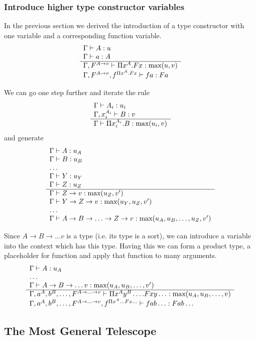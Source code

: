 \subsubsection{Introduce higher type constructor variables}

In the previous section we derived the introduction of a type constructor with
one variable and a corresponding function variable.
$$
\rulev
{
    \Gamma \vdash A: u
    \\
    \Gamma \vdash a: A

}
{
    \Gamma, F^{A\to v} \vdash \Pi x^A. F x: \max(u,v)
    \\
    \Gamma, F^{A\to v}, f^{\Pi x^A. F x} \vdash f a: F a
}
$$

We can go one step further and iterate the rule
$$
\begin{array}{l} 
    \Gamma \vdash A_i: u_i
    \\
    \Gamma, x_i^{A_i} \vdash B: v
 \\ \hline 
    \Gamma \vdash \Pi x_i^{A_i}. B : \text{max}(u_i, v)
\end{array}
$$
%
and generate
%
$$
\begin{array}{l} 
    \Gamma \vdash A: u_A
    \\
    \Gamma \vdash B: u_B
    \\
    \ldots
    \\
    \Gamma \vdash Y: u_Y
    \\
    \Gamma \vdash Z: u_Z
 \\ \hline 
    \Gamma \vdash Z \to v : \text{max}(u_Z, v')
    \\
    \Gamma \vdash Y \to Z \to v: \text{max}(u_Y, u_Z, v')
    \\
    \ldots
    \\
    \Gamma
    \vdash
    A \to B \to \ldots \to Z \to v:
    \text{max}(u_A, u_B, \ldots, u_Z, v')
\end{array}
$$

Since $A \to B \to \ldots v$ is a type (i.e. its type is a sort), we can
introduce a variable into the context which has this type. Having this we can
form a product type, a placeholder for function and apply that function to many
arguments.
%
$$
\rulev
{
    \Gamma \vdash A: u_A
    \\ \ldots \\
    \Gamma \vdash A \to B \to \ldots v : \max(u_A, u_B, \ldots, v')
}
{
    \Gamma, a^A, b^B, \ldots, F^{A\to \ldots \to v}
    \vdash
    \Pi x^A y^B \ldots. F x y \ldots: \max(u_A, u_B, \ldots, v)

    \\
    \Gamma, a^A, b^B, \ldots, F^{A\to \ldots \to v}, f^{\Pi x^A \ldots F x \ldots}
    \vdash
    f a b \ldots : F a b \ldots
}
$$




\subsection{The Most General Telescope}


